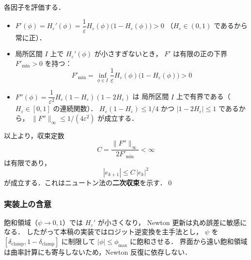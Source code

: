 各因子を評価する．
\begin{itemize}
  \item $F'(\phi) = H_\varepsilon'(\phi) = \dfrac{1}{\varepsilon}H_\varepsilon(\phi)\bigl(1-H_\varepsilon(\phi)\bigr) > 0$
        （$H_\varepsilon \in (0,1)$ であるから常に正）．

  \item 局所区間 $I$ 上で $H_\varepsilon'(\phi)$ が小さすぎないとき，
        $F'$ は有限の正の下界 $F'_{\min} > 0$ を持つ：
        \[
          F'_{\min} = \inf_{\phi\in I} \frac{1}{\varepsilon}H_\varepsilon(\phi)\bigl(1-H_\varepsilon(\phi)\bigr) > 0
        \]

  \item $F''(\phi) = \dfrac{1}{\varepsilon^2}H_\varepsilon(1-H_\varepsilon)(1-2H_\varepsilon)$ は
        局所区間 $I$ 上で有界である（$H_\varepsilon \in [0,1]$ の連続関数）．
        $H_\varepsilon(1-H_\varepsilon) \le 1/4$ かつ $|1-2H_\varepsilon| \le 1$ であるから，
        $\|F''\|_\infty \le 1/(4\varepsilon^2)$ が成立する．
\end{itemize}

以上より，収束定数
\[
  C = \frac{\|F''\|_\infty}{2 F'_{\min}}
    < \infty
\]
は有限であり，
\[
  |e_{k+1}| \le C\,|e_k|^2
\]
が成立する．これはニュートン法の\textbf{二次収束}を示す．\qed

\subsubsection*{実装上の含意}

飽和領域（$\psi \to 0,1$）では $H_\varepsilon'$ が小さくなり，
Newton 更新は丸め誤差に敏感になる．
したがって本稿の実装ではロジット逆変換を主手法とし，
$\psi$ を $[\delta_{\text{clamp}},1-\delta_{\text{clamp}}]$ に制限して
$|\phi|\le\phi_{\max}$ に飽和させる．
界面から遠い飽和領域は曲率計算にも寄与しないため，Newton 反復に依存しない．

